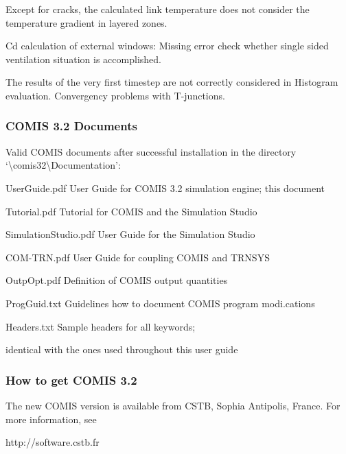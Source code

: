 \documentclass[10pt]{article}
\begin{document}
Except for cracks, the calculated link temperature does not consider the temperature gradient in layered zones. 

Cd calculation of external windows: Missing error check whether single sided ventilation situation is accomplished.

The results of the very first timestep are not correctly considered in Histogram evaluation. 
Convergency problems with T-junctions. 


\subsubsection{COMIS 3.2 Documents}

Valid COMIS documents after successful installation in the directory `\textbackslash comis32\textbackslash Documentation':

UserGuide.pdf  User Guide for COMIS 3.2 simulation engine; this document

Tutorial.pdf  Tutorial for COMIS and the Simulation Studio

SimulationStudio.pdf  User Guide for the Simulation Studio

COM-TRN.pdf  User Guide for coupling COMIS and TRNSYS

OutpOpt.pdf  Definition of COMIS output quantities

ProgGuid.txt  Guidelines how to document COMIS program modi.cations

Headers.txt  Sample headers for all keywords;

identical with the ones used throughout this user guide

\subsubsection{How to get COMIS 3.2}

The new COMIS version is available from CSTB, Sophia Antipolis, France. For more information, see

http://software.cstb.fr
\end{document}
